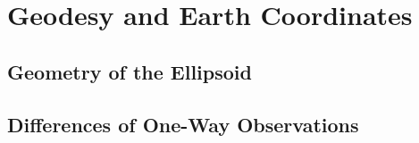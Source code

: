 \documentclass[a4paper,12pt]{book}
\begin{document}

\part{Geodesy and Earth Coordinates}
	\chapter{Geometry of the Ellipsoid}
	\minitoc %
	\newpage%
		
		
		
		
		
		
		
		
		
		
	
	\chapter{Differences of One-Way Observations}
	\minitoc %
	\newpage%
		
		
		
		
		
		
		
	

\backmatter
\end{document}
